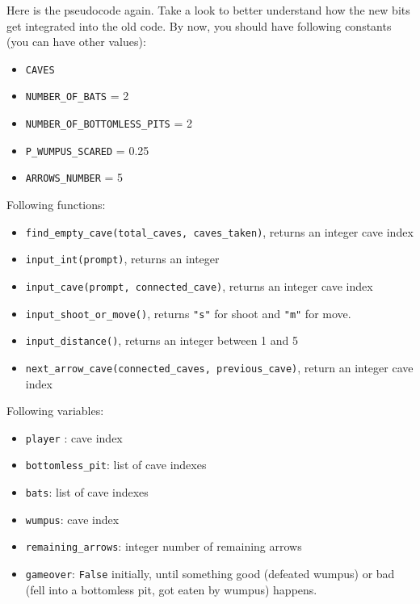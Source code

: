 \documentclass[
]{book}
\providecommand{\tightlist}{%
  \setlength{\itemsep}{0pt}\setlength{\parskip}{0pt}}
\begin{document}
Here is the pseudocode again. Take a look to better understand how the new bits get integrated into the old code. By now, you should have following constants (you can have other values):

\begin{itemize}
\tightlist
\item
  \texttt{CAVES}
\item
  \texttt{NUMBER\_OF\_BATS} = 2
\item
  \texttt{NUMBER\_OF\_BOTTOMLESS\_PITS} = 2
\item
  \texttt{P\_WUMPUS\_SCARED} = 0.25
\item
  \texttt{ARROWS\_NUMBER} = 5
\end{itemize}

Following functions:

\begin{itemize}
\tightlist
\item
  \texttt{find\_empty\_cave(total\_caves,\ caves\_taken)}, returns an integer cave index
\item
  \texttt{input\_int(prompt)}, returns an integer
\item
  \texttt{input\_cave(prompt,\ connected\_cave)}, returns an integer cave index
\item
  \texttt{input\_shoot\_or\_move()}, returns \texttt{"s"} for shoot and \texttt{"m"} for move.
\item
  \texttt{input\_distance()}, returns an integer between 1 and 5
\item
  \texttt{next\_arrow\_cave(connected\_caves,\ previous\_cave)}, return an integer cave index
\end{itemize}

Following variables:

\begin{itemize}
\tightlist
\item
  \texttt{player} : cave index
\item
  \texttt{bottomless\_pit}: list of cave indexes
\item
  \texttt{bats}: list of cave indexes
\item
  \texttt{wumpus}: cave index
\item
  \texttt{remaining\_arrows}: integer number of remaining arrows
\item
  \texttt{gameover}: \texttt{False} initially, until something good (defeated wumpus) or bad (fell into a bottomless pit, got eaten by wumpus) happens.
\end{itemize}
\end{document}

